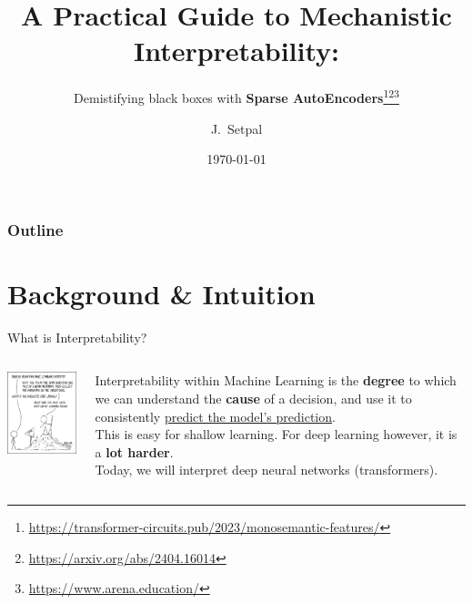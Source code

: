 \documentclass{beamer}
\title[Mechanistic Interpretability]{A Practical Guide to Mechanistic Interpretability:}
\subtitle{Demistifying black boxes with \textbf{Sparse AutoEncoders}\thanks{\tiny \url{https://transformer-circuits.pub/2023/monosemantic-features/}}\thanks{\tiny \url{https://arxiv.org/abs/2404.16014}}\thanks{\tiny{\url{https://www.arena.education/}}}}
\author[Machine Learning @ Purdue] %
{J.~Setpal}
\date{\today}
\begin{document}
\frame{\titlepage}


\begin{frame}
\frametitle{Outline}
\tableofcontents
\end{frame}

\section{Background \& Intuition}
\begin{frame}{What is Interpretability?}
	\begin{columns}
		\begin{column}{0.5\textwidth}
			\begin{center}
				\includegraphics[width=5cm]{img/1838} \pause
			\end{center}
		\end{column}
		\begin{column}{0.5\textwidth}
			Interpretability within Machine Learning is the \textbf{degree} to which we can understand the \textbf{cause} of a decision, and use it to consistently \underline{predict the model's prediction}. \pause \newline \\

			This is easy for shallow learning. \pause For deep learning however, it is a \textbf{lot harder}. \pause \newline \\
			Today, we will interpret deep neural networks (transformers). 
		\end{column}
	\end{columns}
\end{frame}
\end{document}

